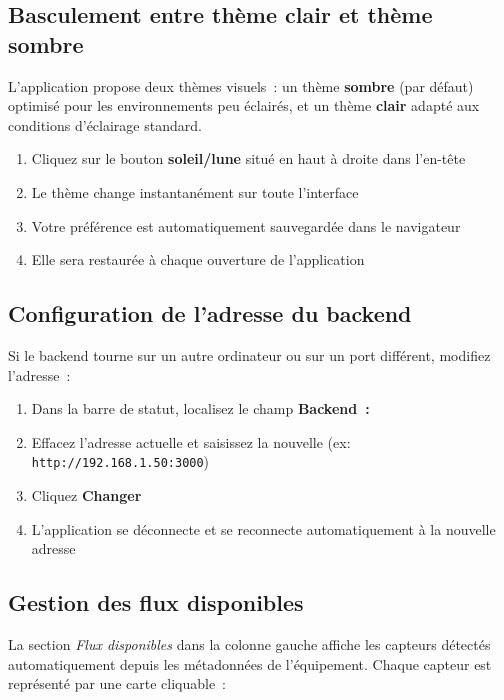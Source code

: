 \documentclass[a4paper,12pt]{article}
\newcommand{\cmd}[1]{\texttt{\colorbox{CodeBg}{\textcolor{PrimaryBlue}{#1}}}}
\begin{document}
\subsection{Basculement entre th\`eme clair et th\`eme sombre}

L'application propose deux th\`emes visuels~: un th\`eme \textbf{sombre} (par d\'efaut)
optimis\'e pour les environnements peu \'eclair\'es, et un th\`eme \textbf{clair} adapt\'e
aux conditions d'\'eclairage standard.

\begin{enumerate}[noitemsep, label=\arabic*.]
  \item Cliquez sur le bouton \textbf{soleil/lune} situ\'e en haut \`a droite dans l'en-t\^ete
  \item Le th\`eme change instantan\'ement sur toute l'interface
  \item Votre pr\'ef\'erence est automatiquement sauvegard\'ee dans le navigateur
  \item Elle sera restaur\'ee \`a chaque ouverture de l'application
\end{enumerate}

\subsection{Configuration de l'adresse du backend}

Si le backend tourne sur un autre ordinateur ou sur un port diff\'erent, modifiez l'adresse~:

\begin{enumerate}[noitemsep, label=\arabic*.]
  \item Dans la barre de statut, localisez le champ \textbf{Backend~:}
  \item Effacez l'adresse actuelle et saisissez la nouvelle (ex: \cmd{http://192.168.1.50:3000})
  \item Cliquez \textbf{Changer}
  \item L'application se d\'econnecte et se reconnecte automatiquement \`a la nouvelle adresse
\end{enumerate}

\subsection{Gestion des flux disponibles}

La section \textit{Flux disponibles} dans la colonne gauche affiche les capteurs d\'etect\'es
automatiquement depuis les m\'etadonn\'ees de l'\'equipement.
Chaque capteur est repr\'esent\'e par une carte cliquable~:
\end{document}
